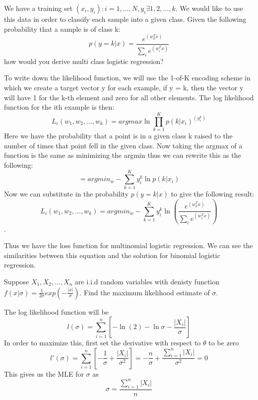\begin{Parts}

\Part
We have a training set ${(x_i, y_i): i = 1,...,N}, y_i \exists {1,2,...,k}$. We would like to use this data in order to classify each sample into a given class.  Given the following probability that a sample is of class k: $$p(y=k|x) = \frac{e^{(w_k^Tx)}}{\sum_i e^{(w_i^Tx)} } $$ how would you derive multi class logistic regression?\\
 
\begin{solution}
To write down the likelihood function, we will use the 1-of-K encoding scheme in which we create a target vector y for each example, if y = k, then the vector y will have 1 for the k-th element and zero for all other elements. The log likelihood function for the ith example is then:
$$L_i(w_1, w_2,...,w_k) = argmax \ln \prod_{k=1}^{K} p(k|x_i)^{(y_i^k)}$$
Here we have the probability that a point is in a given class k raised to the number of times that point fell in the given class. Now taking the argmax of a function is the same as minimizing the argmin thus we can rewrite this as the following:
$$ = argmin_w - \sum_{k=1}^{K} y_i^k \ln p(k|x_i)$$
Now we can substitute in the probability $p(y=k|x)$ to give the following result:
$$L_i(w_1, w_2,...,w_k)  = argmin_w - \sum_{k=1}^{K} y_i^k \ln (\frac{e^{(w_k^Tx)}}{\sum_i e^{(w_i^Tx)}} )$$.

Thus we have the loss function for multinomial logistic regression. We can see the similarities between this equation and the solution for binomial logistic regression.

\end {solution}

\Part
Suppose $X_1, X_2, ..., X_n$ are i.i.d random variables with denisty function $f(x| \sigma) = \frac{1}{2 \sigma} exp (- \frac{|x|}{\sigma})$. Find the maximum likelihood estimate of $\sigma$. 

\begin{solution}
The log likelihood function will be 
$$l(\sigma) = \sum_{i=1}^{n} [-\ln (2) - \ln \sigma - \frac{|X_i|}{\sigma}] $$
In order to maximize this, first set the derivative with respect to $\theta$ to be zero
$$l'(\sigma) = \sum_{i=1}^{n} [-\frac{1}{\sigma} + \frac{|X_i|}{\sigma^2}] = -\frac{n}{\sigma} + \frac{\sum_{i=1}^{n} |X_i|}{\sigma^2} = 0$$
This gives us the MLE for $\sigma$ as 
$$\sigma = \frac{\sum_{i=1}^{n} |X_i|} {n} $$
\end{solution}


\end{Parts}
